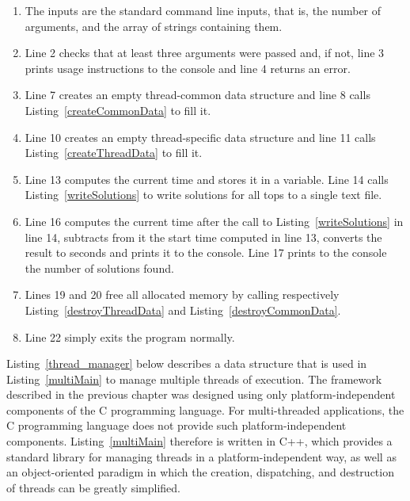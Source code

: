 \begin{enumerate}
\item The inputs are the standard command line inputs, that is, the number of arguments, and the array of strings containing them.
\item Line 2 checks that at least three arguments were passed and, if not, line 3 prints usage instructions to the console and line 4 returns an error.
\addtocounter{enumi}{4}
\item Line 7 creates an empty thread-common data structure and line 8 calls Listing~\ref{createCommonData} to fill it.
\addtocounter{enumi}{2}
\item Line 10 creates an empty thread-specific data structure and line 11 calls Listing~\ref{createThreadData} to fill it.
\addtocounter{enumi}{2}
\item Line 13 computes the current time and stores it in a variable. Line 14 calls Listing~\ref{writeSolutions} to write solutions for all tops to a single text file.
\addtocounter{enumi}{2}
\item Line 16 computes the current time after the call to Listing~\ref{writeSolutions} in line 14, subtracts from it the start time computed in line 13, converts the result to seconds and prints it to the console. Line 17 prints to the console the number of solutions found.
\addtocounter{enumi}{2}
\item Lines 19 and 20 free all allocated memory by calling respectively Listing~\ref{destroyThreadData} and Listing~\ref{destroyCommonData}.
\addtocounter{enumi}{2}
\item Line 22 simply exits the program normally.
\end{enumerate}


Listing~\ref{thread_manager} below describes a data structure that is used in Listing~\ref{multiMain} to manage multiple threads of execution. The framework described in the previous chapter was designed using only platform-independent components of the C programming language. For multi-threaded applications, the C programming language does not provide such platform-independent components. Listing~\ref{multiMain} therefore is written in C++, which provides a standard library for managing threads in a platform-independent way, as well as an object-oriented paradigm in which the creation, dispatching, and destruction of threads can be greatly simplified.

